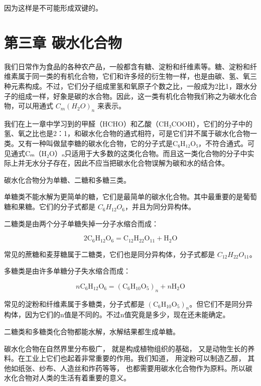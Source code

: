 因为这样是不可能形成双键的。

\chapter{第三章 碳水化合物}

我们日常作为食品的各种农产品，一般都含有糖、淀粉和纤维素等。糖、淀粉和纤维素属于同一类的有机化合物，它们和许多烃的衍生物一样，也是由碳、氢、氧三种元素构成。不过，它们分子组成里氢和氧原子个数之比，一般成为2比1，跟水分子的组成一样，好象是碳的水合物。因此，这一类有机化合物我们称之为碳水化合物，可以用通式
\(C_{m}(H_{2}O)_{n}\) 来表示。

我们在上一章中学习到的甲醛（HCHO）和乙酸（CH₃COOH），它们的分子中的氢、氧之比也是2：1，和碳水化合物的通式相符，可是它们并不属于碳水化合物一类。又有一种叫做鼠李糖的碳水化合物，它的分子式是C₆H₁₂O₅，不符合通式。可见通式Cₘ（H₂O）ₙ只适用于大多数的这类化合物。而且这一类化合物的分子中实际上并无水分子存在，因此不应当把碳水化合物误解为碳和水的结合体。

碳水化合物分为单糖、二糖和多糖三类。

单糖类不能水解为更简单的糖，它们是最简单的碳水化合物。其中最重要的是葡萄糖和果糖。它们的分子式都是
\(C_{6}H_{12}O_{6}\)，并且为同分异构体。

二糖类是由两个分子单糖失掉一分子水缩合而成：

\[
2 \mathrm{C} _ {6} \mathrm{H} _ {12} \mathrm{O} _ {6} = \mathrm{C} _ {12} \mathrm{H} _ {22} \mathrm{O} _ {11} + \mathrm{H} _ {2} \mathrm{O}
\]

常见的蔗糖和麦芽糖属于二糖类，它们也是同分异构体，分子式都是
\(C_{12}H_{22}O_{11}\)。

多糖类是由许多单糖分子失水缩合而成：

\[
n \mathrm{C} _ {6} \mathrm{H} _ {12} \mathrm{O} _ {6} = (\mathrm{C} _ {6} \mathrm{H} _ {10} \mathrm{O} _ {5}) _ {n} + n \mathrm{H} _ {2} \mathrm{O}
\]

常见的淀粉和纤维素属于多糖类，分子式都是
\(\left(\mathrm{C}_{6}\mathrm{H}_{10}\mathrm{O}_{5}\right)_{n}\)。但它们不是同分异构体，因为它们的n值是不同的。不过n值究竟是多少，现在还未能确定。

二糖类和多糖类化合物都能水解，水解结果都生成单糖。

碳水化合物在自然界里分布极广， 就是构成植物组织的基础，
又是动物生长的养料。在工业上它们也起着非常重要的作用。我们知道，
用淀粉可以制造乙醇， 其他如纸张、纱布、人造丝和炸药等等，
也都需要用碳水化合物作为原料。所以碳水化合物对人类的生活有着重要的意义。


